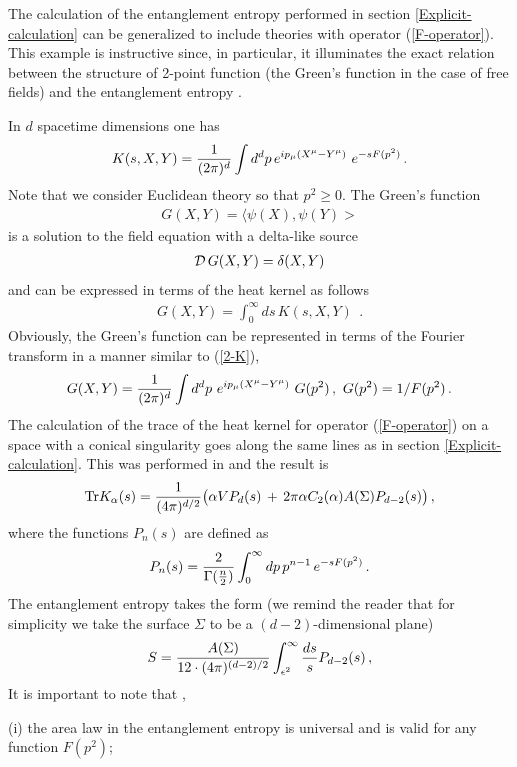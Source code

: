\documentclass[12pt]{article}
\def\Tr{\hbox{Tr}}
\def\be{\begin{eqnarray}}
\def\ee{\end{eqnarray}}
\def\lb{\label}
\def\o{\over}
\begin{document}
The calculation of the entanglement entropy performed in section \ref{Explicit-calculation} can be generalized to include theories with 
operator (\ref{F-operator}).  This example is instructive  since, in particular,  it illuminates the exact relation between the structure of 2-point function
(the Green's function in the case of free fields) and the entanglement entropy  \cite{Nesterov:2010jh}.

In $d$ spacetime dimensions one has
 \begin{equation}
  K(s,X,Y)={1\over (2\pi)^d}\int d^dp \,e^{ip_\mu(X^\mu{-}Y^\mu)}~e^{-sF(p^2)}\,.
 \lb{2-K}
 \end{equation}
 Note that we consider Euclidean theory so that $p^2\geq 0$.
The Green's function 
\be
G(X,Y)=\langle\psi(X), \psi(Y)>
\lb{Green's}
\ee 
is a solution to the field equation with a delta-like source
\be
{\cal D} \, G(X,Y)=\delta(X,Y)
\lb{G}
\ee
and can be expressed in terms of the heat kernel as follows
\be
G(X,Y)=\int_0^\infty ds \, K(s,X,Y)~~.
\lb{GK}
\ee
Obviously, the Green's function can be represented in terms of the Fourier transform in a manner similar to (\ref{2-K}),
\be
G(X,Y)={1\over (2\pi)^d}\int d^dp ~e^{ip_\mu(X^\mu{-}Y^\mu)}~ G(p^2)\,,\,\, G(p^2)=1/F(p^2)\, .
 \lb{2-2}
 \ee
The calculation of the trace of the heat kernel for operator (\ref{F-operator}) on  a space with a conical singularity 
goes along the same lines as in section \ref{Explicit-calculation}. This was performed in \cite{Nesterov:2010yi} and the result is
\begin{equation}
  \Tr K_\alpha(s) =\frac1{(4\pi)^{d/2}} \big( \alpha V P_{d}(s)
   \, + \,2\pi \alpha C_2(\alpha)A(\Sigma)P_{d-2}(s)\big)\, ,
 \lb{K-general-F}
 \end{equation}
where the functions $P_n(s)$ are defined as
\begin{equation}
  P_{n}(s)=\frac2{\Gamma({n\o 2} )}\int_0^\infty dp\, p^{n-1}\, e^{-s F(p^2)}\, .
 \label{functions-Pn}
 \end{equation}
 The entanglement entropy  takes the form (we remind the reader that for simplicity we take the surface $\Sigma$ to be 
a $(d-2)$-dimensional plane) \cite{Nesterov:2010yi}
\be
  S=\frac{A(\Sigma)}{12\cdot (4\pi)^{(d{-}2)/2}}
  \int_{\epsilon^2}^\infty {ds\o s}P_{d-2}(s)\,,
 \lb{Sent-general-F}
 \ee
 It is important to note that \cite{Nesterov:2010yi},  \cite{Nesterov:2010jh}
 
 \medskip
 
 
\noindent (i) the area law in the entanglement entropy is universal and is valid for any function $F(p^2)$;
\end{document}
